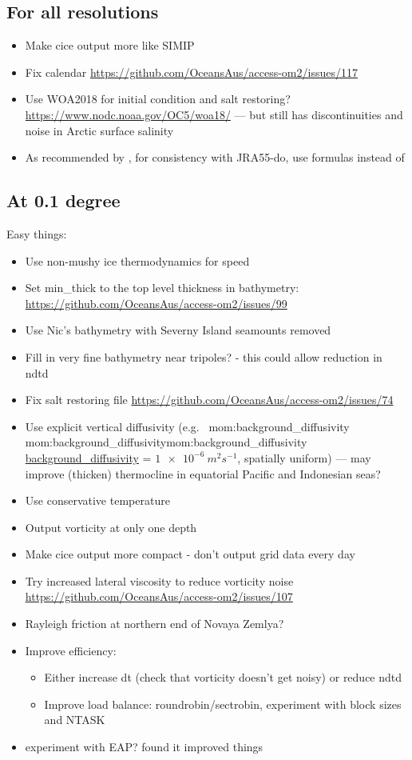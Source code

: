 \documentclass[11pt]{article}
\makeatletter
\newcommand*{\make@hex@label}[1]{%
  \def\hex@label{#1}%
  \@onelevel@sanitize\hex@label
  \EdefEscapeHex\hex@label{\hex@label}%
}
\newcommand*{\hexhyperlink}[2]{%
  \make@hex@label{#1}%
  \hyperlink{\hex@label}{#2}%
}
\newcommand{\momlink}[2]{\hexhyperlink{mom:#2}{#1}}
\newcommand{\param}[1]{\textsf{#1}}
\newcommand{\mom}[1]{\param{\momlink{#1}{#1}}}
\makeatother
\begin{document}
\subsection{For all resolutions}
\begin{itemize}
\item Make cice output more like SIMIP \citep{NotzJahnHollandHunkeMassonnetStroeveTremblayVancoppenolle2016a}
\item Fix calendar \url{https://github.com/OceansAus/access-om2/issues/117}
\item Use WOA2018 for initial condition and salt restoring? \url{https://www.nodc.noaa.gov/OC5/woa18/} --- but still has discontinuities and noise in Arctic surface salinity
\item As recommended by \citet{TsujinoETAL2018a}, for consistency with JRA55-do, use \citet{Gill82a} formulas instead of \citet{LargeYeager2004a,LargeYeager2009a}
\end{itemize}


\subsection{At 0.1 degree}
Easy things:
\begin{itemize}
\item Use non-mushy ice thermodynamics for speed
\item Set min_thick to the top level thickness in bathymetry: \url{https://github.com/OceansAus/access-om2/issues/99}
\item Use Nic's bathymetry with Severny Island seamounts removed
\item Fill in very fine bathymetry near tripoles? - this could allow reduction in ndtd
\item Fix salt restoring file \url{https://github.com/OceansAus/access-om2/issues/74}
\item Use explicit vertical diffusivity (e.g.\ \mom{background_diffusivity} = $\SI{1e-6}{m^2s^{-1}}$, spatially uniform) --- may improve (thicken) thermocline in equatorial Pacific and Indonesian seas?
\item Use conservative temperature
\item Output vorticity at only one depth
\item Make cice output more compact - don't output grid data every day
\item Try increased lateral viscosity to reduce vorticity noise \url{https://github.com/OceansAus/access-om2/issues/107}
\item Rayleigh friction at northern end of Novaya Zemlya?
\item Improve efficiency:
\begin{itemize}
\item Either increase dt (check that vorticity doesn't get noisy) or reduce ndtd
\item Improve load balance: roundrobin/sectrobin, experiment with block sizes and NTASK
\end{itemize}
\item experiment with EAP? \citet{Naughten2018a} found it improved things
\end{itemize}
\end{document}
